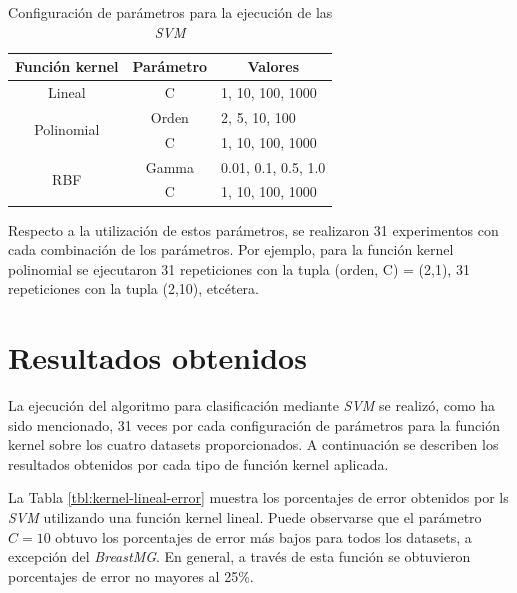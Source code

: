 \documentclass[spanish,12pt]{article}
\begin{document}
\begin{table}[h]
\centering
\begin{tabular}{@{}ccl@{}}
\toprule
\multicolumn{1}{c}{\textbf{Función kernel}} & \multicolumn{1}{c}{\textbf{Parámetro}} & \multicolumn{1}{c}{\textbf{Valores}} \\ \midrule
Lineal                                      & C                                      & 1, 10, 100, 1000                     \\ \cmidrule{2-3}
\multirow{2}{*}{Polinomial}                 & Orden                                  & 2, 5, 10, 100                        \\
                                            & C                                      & 1, 10, 100, 1000                     \\ \cmidrule{2-3}
\multirow{2}{*}{RBF}                        & Gamma                                  & 0.01, 0.1, 0.5, 1.0                  \\
                                            & C                                      & 1, 10, 100, 1000                     \\ \bottomrule
\end{tabular}
\caption{Configuración de parámetros para la ejecución de las \emph{SVM}}
\label{tbl:parametros}
\end{table}

Respecto a la utilización de estos parámetros, se realizaron 31 experimentos con cada combinación de los parámetros.
Por ejemplo, para la función kernel polinomial se ejecutaron 31 repeticiones con la tupla (orden, C) = (2,1), 31 repeticiones con la tupla (2,10), etcétera.

\section{Resultados obtenidos}
La ejecución del algoritmo para clasificación mediante \emph{SVM} se realizó, como ha sido mencionado, 31 veces por cada configuración de parámetros para la función kernel sobre los cuatro datasets proporcionados. 
A continuación se describen los resultados obtenidos por cada tipo de función kernel aplicada.

La Tabla \ref{tbl:kernel-lineal-error} muestra los porcentajes de error obtenidos por ls \emph{SVM} utilizando una función kernel lineal.
Puede observarse que el parámetro $C=10$ obtuvo los porcentajes de error más bajos para todos los datasets, a excepción del \emph{BreastMG}.
En general, a través de esta función se obtuvieron porcentajes de error no mayores al 25\%.
\end{document}
